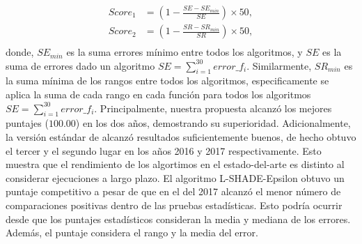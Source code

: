 %
\begin{equation}\label{eqn:total_scores}
\begin{split}
Score_1 &= \left (1 - \frac{SE - SE_{min}}{SE} \right) \times 50, \\
Score_2 &= \left  (1 - \frac{SR - SR_{min}}{SR} \right ) \times 50, \\
\end{split}
\end{equation}
donde, $SE_{min}$ es la suma errores mínimo entre todos los algoritmos, y $SE$ es la suma de errores dado un algoritmo $SE = \sum_{i=1}^{30} error\_f_i$.
%
Similarmente, $SR_{min}$ es la suma mínima de los rangos entre todos los algoritmos, especificamente se aplica la suma de cada rango en cada función para todos los algoritmos $SE = \sum_{i=1}^{30} error\_f_i$.
%
%
Principalmente, nuestra propuesta alcanzó los mejores puntajes ($100.00$) en los dos años, demostrando su superioridad. 
%
Adicionalmente, la versión estándar de \DE{} alcanzó resultados suficientemente buenos, de hecho obtuvo el tercer y el segundo lugar en los años 2016 y 2017 respectivamente.
%
Esto muestra que el rendimiento de los algortimos en el estado-del-arte es distinto al considerar ejecuciones a largo plazo.
%
El algoritmo L-SHADE-Epsilon obtuvo un puntaje competitivo a pesar de que en el \CEC{} del 2017  alcanzó el menor número de comparaciones positivas dentro de las pruebas estadísticas.
%
Esto podría ocurrir desde que los puntajes estadísticos consideran la media y mediana de los errores.
%
Además, el puntaje considera el rango y la media del error.
%

